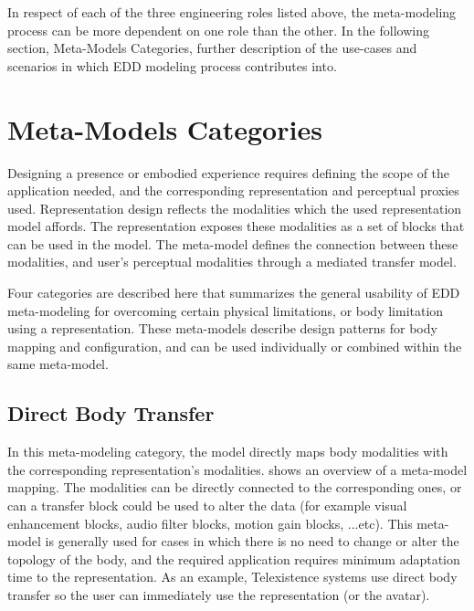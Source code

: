 In respect of each of the three engineering roles listed above, the meta-modeling process can be more dependent on one role than the other. In the following section, Meta-Models Categories, further description of the use-cases and scenarios in which EDD modeling process contributes into.





\section{Meta-Models Categories}
\label{sec:concept-metalmodel}

Designing a presence or embodied experience requires defining the scope of the application needed, and the corresponding representation and perceptual proxies used. Representation design reflects the modalities which the used representation model affords. The representation exposes these modalities as a set of blocks that can be used in the model. The meta-model defines the connection between these modalities, and user's perceptual modalities through a mediated transfer model. 

Four categories are described here that summarizes the general usability of EDD meta-modeling for overcoming certain physical limitations, or body limitation using a representation. These meta-models describe design patterns for body mapping and configuration, and can be used individually or combined within the same meta-model.

\subsection{Direct Body Transfer}
\label{sec:concept-direct}

In this meta-modeling category, the model directly maps body modalities with the corresponding representation's modalities.  shows an overview of a meta-model mapping. The modalities can be directly connected to the corresponding ones, or can a transfer block could be used to alter the data (for example visual enhancement blocks, audio filter blocks, motion gain blocks, ...etc). This meta-model is generally used for cases in which there is no need to change or alter the topology of the body, and the required application requires minimum adaptation time to the representation. As an example, Telexistence systems use direct body transfer so the user can immediately use the representation (or the avatar).

